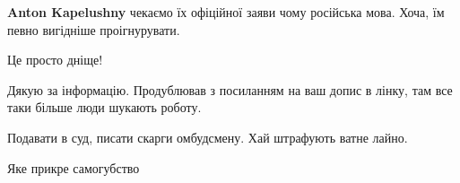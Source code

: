\begin{itemize}
\begin{itemize}
\textbf{Anton Kapelushny} чекаємо їх офіційної заяви чому російська мова. Хоча, їм певно вигідніше проігнурувати.
\end{itemize} %

Це просто дніще!

Дякую за інформацію. Продублював з посиланням на ваш допис в лінку, там все таки більше люди шукають роботу.

Подавати в суд, писати скарги омбудсмену. Хай штрафують ватне лайно.

Яке прикре самогубство

\end{itemize} %
